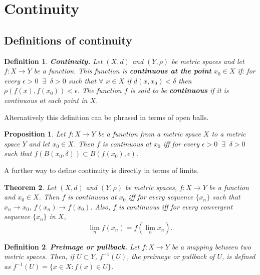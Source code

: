 \documentclass[two column]{article}
\newtheorem{theorem}{Theorem}[subsection]
\newtheorem{proposition}[theorem]{Proposition}
\newtheorem{definition}{Definition}[subsection]
\begin{document}
\section{Continuity}

\subsection{Definitions of continuity}

\begin{definition}
{\bf Continuity.} Let $(X,d)$ and $(Y, \rho)$ be metric spaces and let $f:X\rightarrow Y$ be a function. This function is {\bf continuous at the point} $x_{0} \in X$ if: for every $\epsilon >0 \;\; \exists \;\; \delta > 0$ such that $\forall$ $x \in X$ if $d(x,x_{0}) < \delta$ then $\rho(f(x),f(x_{0})) < \epsilon$. The function $f$ is said to be {\bf continuous} if it is continuous at each point in $X$.
\end{definition}

Alternatively this definition can be phrased in terms of open balls.\\

\begin{proposition}
Let $f:X\rightarrow Y$ be a function from a metric space $X$ to a metric space $Y$ and let $x_{0} \in X$. Then $f$ is continuous at $x_{0}$ iff for every $\epsilon >0 \;\; \exists \;\; \delta > 0$ such that $f(B(x_{0},\delta)) \subset B(f(x_{0}),\epsilon)$. 
\end{proposition}

A further way to define continuity is directly in terms of limits. \\

\begin{theorem}
Let $(X,d)$ and $(Y, \rho)$ be metric spaces, $f:X\rightarrow Y$ be a function and $x_{0} \in X$. Then $f$ is continuous at $x_{0}$ iff for every sequence $\{ x_{n} \}$ such that $x_{n} \rightarrow x_{0}$, $f(x_{n}) \rightarrow f(x_{0})$. Also, $f$ is continuous iff for every convergent sequence $\{ x_{n} \}$ in $X$, \vspace{-6pt}
\[ \lim_{n} f(x_{n}) = f(\lim_{n} x_{n}).\]
\end{theorem}

\begin{definition}
{\bf Preimage or pullback.} Let $f: X \rightarrow Y$ be a mapping between two metric spaces. Then, if $U \subset Y$, $f^{-1}(U)$, the preimage or pullback of $U$, is defined as $f^{-1}(U) = \{ x \in X: f(x) \in U \}$.  
\end{definition}
\end{document}
